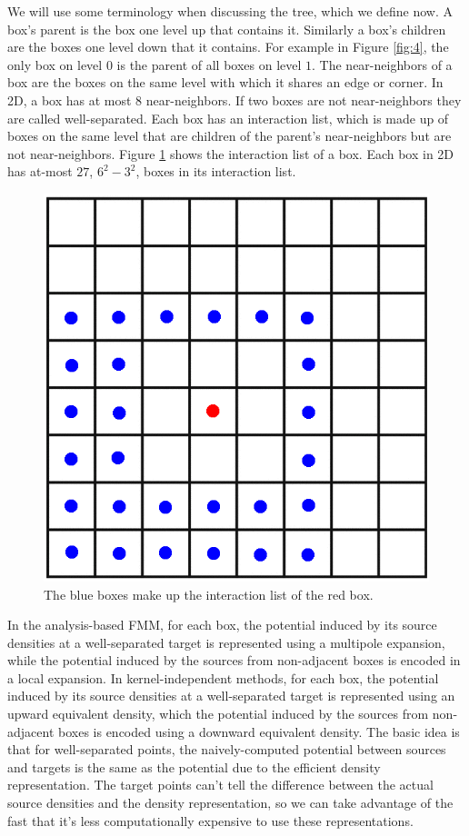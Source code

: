 \documentclass[11pt, oneside]{article}   	%
\begin{document}
We will use some terminology when discussing the tree, which we define now. A box's parent is the box one level up that contains it. Similarly a box's children are the boxes one level down that it contains. For example in Figure \ref{fig:4}, the only box on level $0$ is the parent of all boxes on level $1$. The near-neighbors of a box are the boxes on the same level with which it shares an edge or corner. In 2D, a box has at most $8$ near-neighbors. If two boxes are not near-neighbors they are called well-separated. Each box has an interaction list, which is made up of boxes on the same level that are children of the parent's near-neighbors but are not near-neighbors. Figure \ref{fig:5} shows the interaction list of a box. Each box in 2D has at-most $27$, $6^2-3^2$, boxes in its interaction list.

\begin{figure}[h]
\caption{The blue boxes make up the interaction list of the red box.}
\label{fig:5}
\centering
\includegraphics[scale=0.25]{intlist}
\end{figure}

In the analysis-based FMM, for each box, the potential induced by its source densities at a well-separated target is represented using a multipole expansion, while the potential induced by the sources from non-adjacent boxes is encoded in a local expansion. In kernel-independent methods, for each box, the potential induced by its source densities at a well-separated target is represented using an upward equivalent density, which the potential induced by the sources from non-adjacent boxes is encoded using a downward equivalent density. The basic idea is that for well-separated points, the naively-computed potential between sources and targets is the same as the potential due to the efficient density representation. The target points can't tell the difference between the actual source densities and the density representation, so we can take advantage of the fast that it's less computationally expensive to use these representations.
\end{document}
